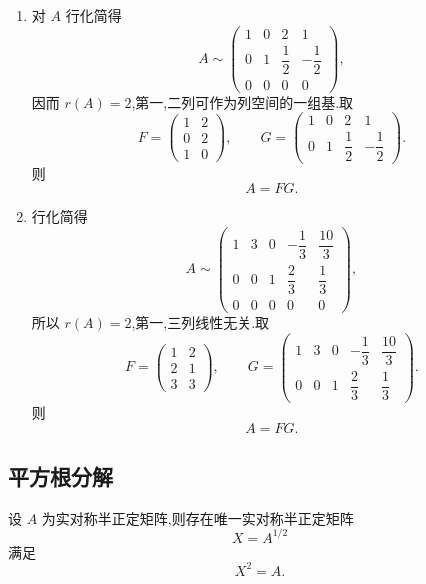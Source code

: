 \begin{solution}
\leavevmode
\begin{enumerate}
    \item 对 $A$ 行化简得
    \[
    A\sim
    \begin{pmatrix}
    1&0&2&1\\
    0&1&\dfrac12&-\dfrac12\\
    0&0&0&0
    \end{pmatrix},
    \]
    因而 $r(A)=2$,第一,二列可作为列空间的一组基.取
    \[
    F=
    \begin{pmatrix}
    1&2\\
    0&2\\
    1&0
    \end{pmatrix},
    \qquad
    G=
    \begin{pmatrix}
    1&0&2&1\\
    0&1&\dfrac12&-\dfrac12
    \end{pmatrix}.
    \]
    则
    \[
    \boxed{A=FG}.
    \]

    \item 行化简得
    \[
    A\sim
    \begin{pmatrix}
    1&3&0&-\dfrac13&\dfrac{10}{3}\\
    0&0&1&\dfrac23&\dfrac13\\
    0&0&0&0&0
    \end{pmatrix},
    \]
    所以 $r(A)=2$,第一,三列线性无关.取
    \[
    F=
    \begin{pmatrix}
    1&2\\
    2&1\\
    3&3
    \end{pmatrix},
    \qquad
    G=
    \begin{pmatrix}
    1&3&0&-\dfrac13&\dfrac{10}{3}\\
    0&0&1&\dfrac23&\dfrac13
    \end{pmatrix}.
    \]
    则
    \[
    \boxed{A=FG}.
    \]
\end{enumerate}
\end{solution}


\subsection{平方根分解}

\begin{theorem}[\marktwostar]
设 $A$ 为实对称半正定矩阵,则存在唯一实对称半正定矩阵
\[
X=A^{1/2}
\]
满足
\[
X^2=A.
\]
\end{theorem}


